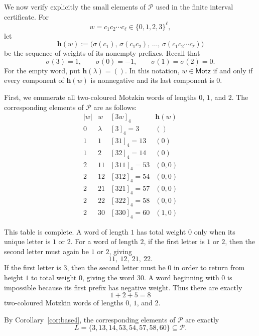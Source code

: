 \documentclass[11pt]{article}
\theoremstyle{plain}
\theoremstyle{definition}
\newcommand{\Pset}{\mathcal P}
\begin{document}
We now verify explicitly the small elements of $\Pset$ used in the finite
interval certificate.  For
\[
 w=c_1c_2\cdots c_\ell\in\{0,1,2,3\}^{\ell},
\]
let
\[
 \mathbf h(w):=
 \bigl(
 \sigma(c_1),\,
 \sigma(c_1c_2),\,
 \ldots,\,
 \sigma(c_1c_2\cdots c_\ell)
 \bigr)
\]
be the sequence of weights of its nonempty prefixes.  Recall that
\[
 \sigma(3)=1,\qquad
 \sigma(0)=-1,\qquad
 \sigma(1)=\sigma(2)=0.
\]
For the empty word, put $\mathbf h(\lambda)=()$.  In this notation,
$w\in\mathsf{Motz}$ if and only if every component of $\mathbf h(w)$ is
nonnegative and its last component is $0$.

First, we enumerate all two-coloured Motzkin words of lengths $0$, $1$,
and $2$.  The corresponding elements of $\Pset$ are as follows:
\[
\begin{array}{c|c|c|c}
 |w|&w&[3w]_4&\mathbf h(w)\\ \hline
0&\lambda &[3]_4=3&()\\ \hline
1&1 &[31]_4=13&(0)\\
1&2 &[32]_4=14&(0)\\ \hline
2&11 &[311]_4=53&(0,0)\\
2&12 &[312]_4=54&(0,0)\\
2&21 &[321]_4=57&(0,0)\\
2&22 &[322]_4=58&(0,0)\\
2&30 &[330]_4=60&(1,0)
\end{array}
\]

This table is complete.  A word of length $1$ has total weight $0$ only
when its unique letter is $1$ or $2$.  For a word of length $2$, if the
first letter is $1$ or $2$, then the second letter must again be $1$ or
$2$, giving
\[
 11,\ 12,\ 21,\ 22.
\]
If the first letter is $3$, then the second letter must be $0$ in order
to return from height $1$ to total weight $0$, giving the word $30$.
A word beginning with $0$ is impossible because its first prefix has
negative weight.  Thus there are exactly
\[
 1+2+5=8
\]
two-coloured Motzkin words of lengths $0$, $1$, and $2$.

By Corollary~\ref{cor:base4}, the corresponding elements of $\Pset$ are
exactly
\begin{equation}\label{eq:L-def}
 L=\{3,13,14,53,54,57,58,60\}
 \subseteq\Pset.
\end{equation}
\end{document}
